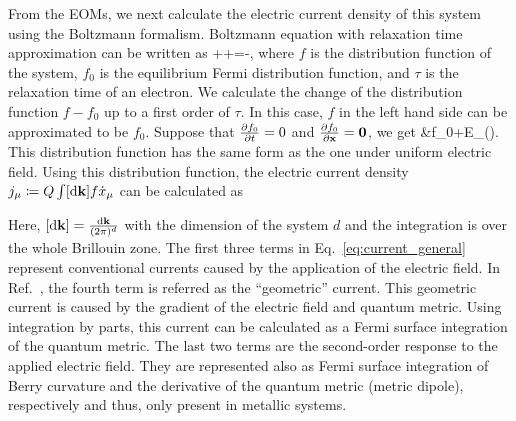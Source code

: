 \documentclass[aps,prb,longbibliography,superscriptaddress,twocolumn]{revtex4-2}
\def\be#1\ee{\begin{align}#1\end{align}}
\begin{document}
From the EOMs, we next calculate the electric current density of this system using the Boltzmann formalism. Boltzmann equation with relaxation time approximation can be written as
\be
    \pdv{f}{t}+\cdot{}+\cdot{}=-,
\ee
where $f$ is the distribution function of the system, $f_0$ is the equilibrium Fermi distribution function, and $\tau$ is the relaxation time of an electron. We calculate the change of the distribution function $f-f_0$ up to a first order of $\tau$. In this case, $f$ in the left hand side can be approximated to be $f_0$. Suppose that $\pdv{f_0}{t}=0$ and $\pdv{f_0}{\vb{x}}=\vb{0}$, we get
\be
    f&\approx f_0+E_{\mu}().
\ee
This distribution function has the same form as the one under uniform electric field. Using this distribution function, the electric current density $j_{\mu}\coloneqq Q\int[\mathrm{d}\vb{k}]f\dot{x}_{\mu}$ can be calculated as
Here, $\qty[\mathrm{d}\vb{k}] = \frac{\mathrm{d}\vb{k}}{(2\pi)^d}$ with the dimension of the system $d$ and the integration is over the whole Brillouin zone. The first three terms in Eq.~\eqref{eq:current_general} represent conventional currents caused by the application of the electric field. In Ref.~\cite{Lapa_Hughes_2019}, the fourth term is referred as the ``geometric'' current. This geometric current is caused by the gradient of the electric field and quantum metric. Using integration by parts, this current can be calculated as a Fermi surface integration of the quantum metric. The last two terms are the second-order response to the applied electric field. They are represented also as Fermi surface integration of Berry curvature and the derivative of the quantum metric (metric dipole), respectively and thus, only present in metallic systems.
\end{document}
